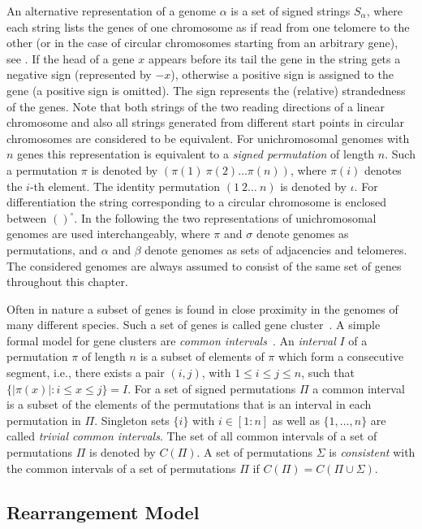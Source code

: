 \documentclass{svmult}
\begin{document}
An alternative representation of a genome $\alpha$ is a set of signed strings
$S_{\alpha}$, where each string lists the genes of one chromosome as if 
read from one telomere to the other (or in the case of circular chromosomes
starting from an arbitrary gene), see . 
If the head of a gene $x$ appears before its tail the gene in the string
gets a negative sign (represented by $-{x}$), otherwise a positive
sign is assigned to the gene (a positive sign is omitted).
The sign represents the (relative) strandedness of the genes. 
Note that both strings of the two reading directions of a linear
chromosome and also all strings generated from different start points in circular chromosomes are considered to be equivalent.
For unichromosomal genomes with $n$ genes
this representation is equivalent to a \emph{signed permutation} of length
$n$. Such a permutation $\pi$ is denoted by
$(\pi(1)~\pi(2)\ldots\pi(n))$, where $\pi(i)$ denotes the $i$-th element.
The identity permutation $(1~2\ldots ~n)$ is denoted by $\iota$.
For differentiation the string corresponding to a circular chromosome is enclosed between $()^\circ$.
In the following the two representations of unichromosomal genomes are
used interchangeably, where $\pi$ and $\sigma$ denote genomes as permutations,
and $\alpha$ and $\beta$ denote genomes as sets of adjacencies and telomeres.
The considered genomes are always assumed to consist of the same
set of genes throughout this chapter.

Often in nature a subset of genes is found in close proximity in the genomes 
of many different species. Such a set of genes is called gene
cluster~\cite{Graham_1995}.
A simple formal model for gene clusters are \emph{common intervals}~\cite{Heber_2001}. An \emph{interval} 
$I$ of a permutation $\pi$ of length $n$ is a subset of elements of $\pi$ which form a consecutive segment, i.e., 
there exists a pair $(i,j)$, with $1 \leq i \le j \leq n$, such that
$\{|\pi(x)|:
i\leq x \leq j\}=I$.
For a set of signed permutations $\Pi$ a common interval is a subset of the elements of the permutations that 
is an interval in each permutation in $\Pi$. Singleton sets $\{i\}$ with $i\in[1:n]$ as well as $\{1,\ldots,n\}$ 
are called \emph{trivial common intervals}.
The set of all common intervals of a set of permutations $\Pi$ is denoted by
$C(\Pi)$.
A set of permutations $\Sigma$ is \emph{consistent} with the common intervals
of a set of permutations $\Pi$ if $C(\Pi)=C(\Pi \cup \Sigma)$.

\subsection{Rearrangement Model}
\end{document}
